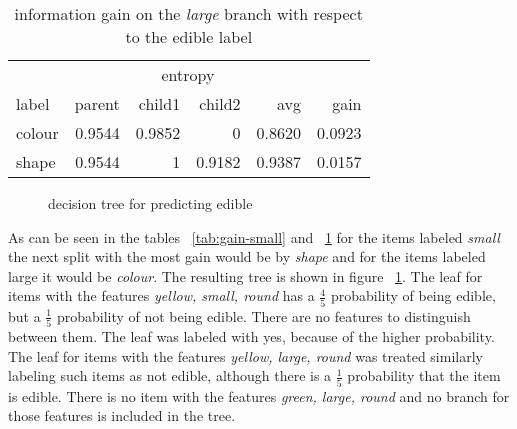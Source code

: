 \documentclass[11pt]{article}
\begin{document}
\begin{enumerate}
\begin{table}[h]
\label{tab:gain-large}
\begin{tabular}{ l r r r r r }
& \multicolumn{4}{c}{entropy} & \\
\cline{2-5}
label & parent & child1 & child2 & avg & gain \\
\hline
colour & 0.9544 & 0.9852 & 0 & 0.8620 & 0.0923 \\
shape & 0.9544 & 1 & 0.9182 & 0.9387 & 0.0157 \\
\end{tabular}
\caption{information gain on the \emph{large} branch with respect to the edible label}
\end{table}

\begin{figure}
\label{fig:tree}
\caption{decision tree for predicting edible}
\end{figure}

As can be seen in the tables ~\ref{tab:gain-small} and ~\ref{tab:gain-large} for the items labeled \emph{small} the next split with the most gain would be by \emph{shape} and for the items labeled large it would be \emph{colour}. The resulting tree is shown in figure ~\ref{fig:tree}. The leaf for items with the features \emph{yellow,  small, round} has a $\frac{4}{5}$ probability of being edible, but a $\frac{1}{5}$ probability of not being edible. There are no features to distinguish between them. The leaf was labeled with yes, because of the higher probability. The leaf for items with the features \emph{yellow,  large, round} was treated similarly labeling such items as not edible, although there is a $\frac{1}{5}$ probability that the item is edible. There is no item with the features \emph{green, large, round} and no branch for those features is included in the tree.




\end{enumerate}
\end{document}
